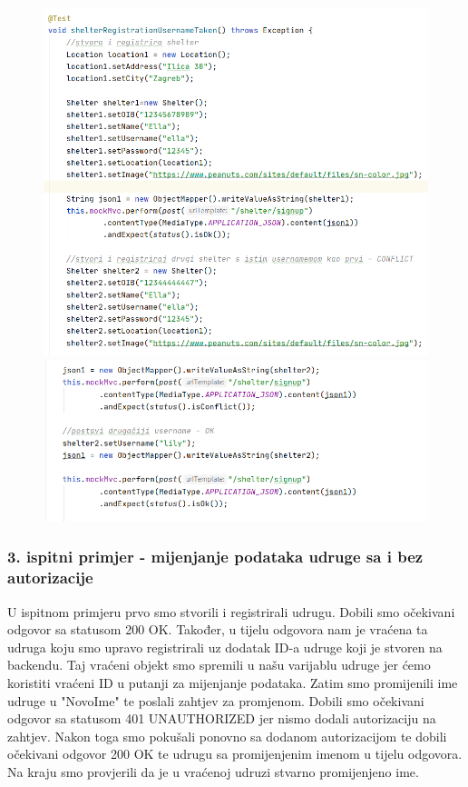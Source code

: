 			\begin{figure}[H]
				\centerline{
					\includegraphics[scale=0.75]{slike/shelter2.1.PNG}}
				\hspace*{-0.22in}
				\includegraphics[scale=0.75]{slike/shelter2.2.PNG} %
				\centering
			\end{figure}
			
			
			
			\subsubsection{3. ispitni primjer - mijenjanje podataka udruge sa i bez autorizacije }
			
			U ispitnom primjeru prvo smo stvorili i registrirali  udrugu. Dobili smo očekivani odgovor sa statusom 200 OK. Također, u tijelu odgovora nam je vraćena ta udruga koju smo upravo registrirali uz dodatak ID-a udruge koji je stvoren na backendu. Taj vraćeni objekt smo spremili u našu varijablu udruge jer ćemo koristiti vraćeni ID u putanji za mijenjanje podataka. Zatim smo promijenili ime udruge u "NovoIme" te poslali zahtjev za promjenom. Dobili smo očekivani odgovor sa statusom 401 UNAUTHORIZED jer nismo dodali autorizaciju na zahtjev. Nakon toga smo pokušali ponovno sa dodanom autorizacijom te dobili očekivani odgovor 200 OK te udrugu sa promijenjenim imenom u tijelu odgovora. Na kraju smo provjerili da je u vraćenoj udruzi stvarno promijenjeno ime.
			
